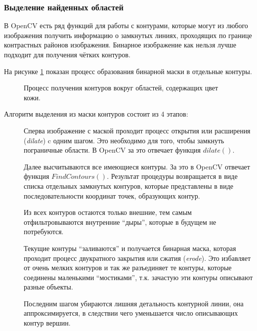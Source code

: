 \documentclass[12pt]{report}
\begin{document}
\subsubsection{Выделение найденных областей}
В OpenCV есть ряд функций для работы с контурами, которые могут из любого изображения получить информацию о 
замкнутых
линиях, проходящих по границе контрастных районов изображения. Бинарное изображение как нельзя лучше подходит для
получения чётких контуров.

На рисунке \ref{fig:countour_process} показан процесс образования бинарной маски в отдельные контуры.

\begin{figure}[h]
	\centering
	\caption{Процесс получения контуров вокруг областей, содержащих цвет кожи.}
	\label{fig:countour_process}
\end{figure}


Алгоритм выделения из маски контуров состоит из 4 этапов:
\begin{description}
\item[] Сперва изображение с маской проходит процесс открытия или расширения (\textit{dilate}) c 
одним шагом. Это 
необходимо для того, чтобы замкнуть пограничные области. В OpenCV за это отвечает функция 
$dilate()$.
\item[] Далее высчитываются все имеющиеся контуры. За это в OpenCV отвечает функция 
$FindContours
()$. Результат 
процедуры возвращается в виде списка отдельных замкнутых контуров, которые представлены в виде последовательности 
координат точек, образующих контур.
\item[] Из всех контуров остаются только внешние, тем самым отфильтровываются внутренние ``дыры'', 
которые в 
будущем не потребуются.
\item[] Текущие контуры ``заливаются'' и получается бинарная маска, которая проходит процесс 
двукратного закрытия 
или сжатия (\textit{erode}). Это избавляет от очень мелких контуров и так же разъединяет те контуры, которые 
соединены маленькими ``мостиками'', т.к. зачастую эти контуры описывают разные объекты.
\item[] Последним шагом убираются лишняя детальность контурной линии, она аппроксимируется, в 
следствии чего 
уменьшается число описывающих контур вершин.
\end{description}
\end{document}
